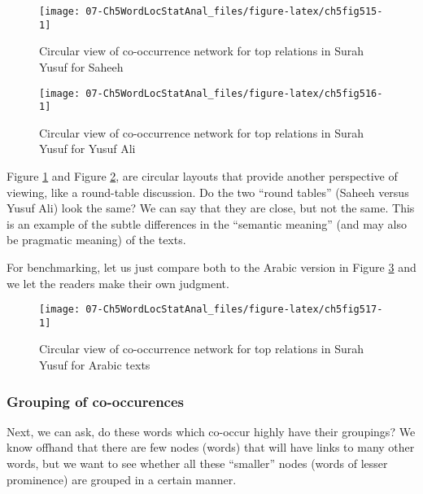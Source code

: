 \documentclass[
]{article}
\begin{document}
\begin{figure}

{\centering \texttt{[image: 07-Ch5WordLocStatAnal\_files/figure-latex/ch5fig515-1]} 

}

\caption{Circular view of co-occurrence network for top relations in Surah Yusuf for Saheeh}\label{fig:ch5fig515}
\end{figure}

\begin{figure}

{\centering \texttt{[image: 07-Ch5WordLocStatAnal\_files/figure-latex/ch5fig516-1]} 

}

\caption{Circular view of co-occurrence network for top relations in Surah Yusuf for Yusuf Ali}\label{fig:ch5fig516}
\end{figure}

Figure \ref{fig:ch5fig515} and Figure \ref{fig:ch5fig516}, are circular layouts that provide another perspective of viewing, like a round-table discussion. Do the two ``round tables'' (Saheeh versus Yusuf Ali) look the same? We can say that they are close, but not the same. This is an example of the subtle differences in the ``semantic meaning'' (and may also be pragmatic meaning) of the texts.

For benchmarking, let us just compare both to the Arabic version in Figure \ref{fig:ch5fig517} and we let the readers make their own judgment.

\begin{figure}

{\centering \texttt{[image: 07-Ch5WordLocStatAnal\_files/figure-latex/ch5fig517-1]} 

}

\caption{Circular view of co-occurrence network for top relations in Surah Yusuf for Arabic texts}\label{fig:ch5fig517}
\end{figure}

\hypertarget{grouping-of-co-occurences}{%
\subsubsection{Grouping of co-occurences}\label{grouping-of-co-occurences}}

Next, we can ask, do these words which co-occur highly have their groupings? We know offhand that there are few nodes (words) that will have links to many other words, but we want to see whether all these ``smaller'' nodes (words of lesser prominence) are grouped in a certain manner.
\end{document}
